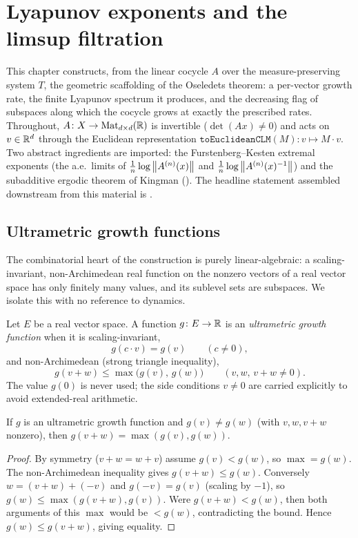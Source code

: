 \chapter{Lyapunov exponents and the limsup filtration}
\label{chap:lyapunov}

This chapter constructs, from the linear cocycle $A$ over the
measure-preserving system $T$, the geometric scaffolding of the Oseledets
theorem: a per-vector growth rate, the finite Lyapunov spectrum it produces,
and the decreasing flag of subspaces along which the cocycle grows at exactly
the prescribed rates. Throughout, $A \colon X \to \mathrm{Mat}_{d\times d}(\mathbb{R})$
is invertible ($\det(A x)\neq 0$) and acts on $v\in\mathbb{R}^d$ through the Euclidean
representation $\mathtt{toEuclideanCLM}(M)\colon v\mapsto M\cdot v$. Two
abstract ingredients are imported: the Furstenberg--Kesten extremal exponents
(the a.e.\ limits of $\tfrac1n\log\left\lVert A^{(n)}(x) \right\rVert$ and
$\tfrac1n\log\left\lVert A^{(n)}(x)^{-1} \right\rVert$) and the subadditive ergodic theorem of
Kingman (). The headline statement assembled downstream
from this material is .

\section{Ultrametric growth functions}

The combinatorial heart of the construction is purely linear-algebraic: a
scaling-invariant, non-Archimedean real function on the nonzero vectors of a
real vector space has only finitely many values, and its sublevel sets are
subspaces. We isolate this with no reference to dynamics.

\begin{definition}\label{IsUltrametricGrowth}
  \leanok
  Let $E$ be a real vector space. A function $g\colon E\to\mathbb{R}$ is an
  \emph{ultrametric growth function} when it is scaling-invariant,
  \[ g(c\cdot v) = g(v) \qquad (c\neq 0), \]
  and non-Archimedean (strong triangle inequality),
  \[ g(v+w) \le \max\bigl(g(v),\,g(w)\bigr)
     \qquad (v,w,\,v+w \neq 0). \]
  The value $g(0)$ is never used; the side conditions $v\neq 0$ are carried
  explicitly to avoid extended-real arithmetic.
\end{definition}

\begin{lemma}\label{add_eq_max_of_ne}
  \leanok
  If $g$ is an ultrametric growth function and $g(v)\neq g(w)$ (with
  $v,w,v+w$ nonzero), then $g(v+w)=\max(g(v),g(w))$.
  \begin{proof}\leanok
  By symmetry ($v+w=w+v$) assume $g(v)<g(w)$, so $\max=g(w)$. The
  non-Archimedean inequality gives $g(v+w)\le g(w)$. Conversely
  $w=(v+w)+(-v)$ and $g(-v)=g(v)$ (scaling by $-1$), so
  $g(w)\le\max(g(v+w),g(v))$. Were $g(v+w)<g(w)$, then both arguments of this
  $\max$ would be $<g(w)$, contradicting the bound. Hence $g(w)\le g(v+w)$,
  giving equality.
  \end{proof}
\end{lemma}

